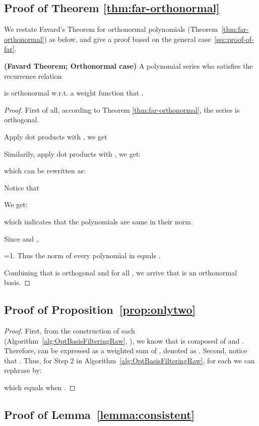  \subsection{Proof of Theorem \ref{thm:far-orthonormal}}
\label{sec:proof-of-favard-orthonormal}

We restate Favard's Theorem for orthonormal polynomials
(Theorem~\ref{thm:far-orthonormal}) as below, and give a proof
based on the general case~\ref{sec:proof-of-far}. 



\textbf{(Favard Theorem; Orthonormal case)}
  A polynomial series  who satisfies the recurrence relation
  
  is orthonormal w.r.t. a weight function  that  . 


\begin{proof}
  First of all, according to Theorem \ref{thm:far-orthonormal}, 
  the series  is orthogonal.
  
  Apply dot products with , we get
  
  
  Similarily, apply dot products with , we get:
  
  which can be rewritten as:
  
  Notice that
  
  We get:
  
  which indicates that the polynomials  are same in their
  norm.
  
  Since  and ,
  
  =1.
Thus the norm of every polynomial in   equals . 
  
  Combining that  is orthogonal and  for all , we arrive that  is an orthonormal basis.
\end{proof}
 \newpage
\subsection{Proof of Proposition~\ref{prop:onlytwo}}
\label{sec:proof-of-vec3term}
\begin{proof}
  First, from the construction of each  (Algorithm~\ref{alg:OptBasisFilteringRaw}, ), 
  we know that  is composed of  and
  . Therefore,  can be expressed as a weighted sum of
  , denoted as 
  .
Second, notice that 
  .
Thus, for Step 2 in Algorithm~\ref{alg:OptBasisFilteringRaw}, 
  for each  
  we can rephrase  by: 
  
which equals  when .
\end{proof} \subsection{Proof of Lemma~\ref{lemma:consistent}}
\label{sec:proof-of-consistent-equation}


